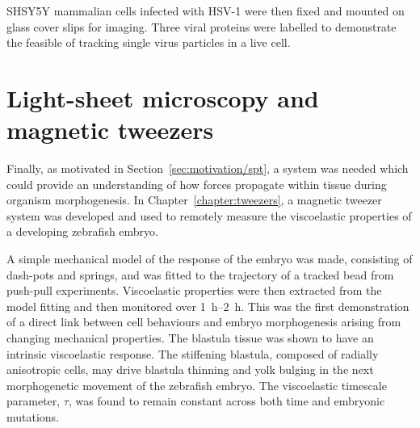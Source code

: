 SHSY5Y mammalian cells infected with \gls{HSV}-1 were then fixed and mounted on glass cover slips for imaging.
Three viral proteins were labelled to demonstrate the feasible of tracking single virus particles in a live cell.

\section{Light-sheet microscopy and magnetic tweezers} %

Finally, as motivated in Section~\ref{sec:motivation/spt}, a system was needed which could provide an understanding of how forces propagate within tissue during organism morphogenesis.
In Chapter~\ref{chapter:tweezers}, a magnetic tweezer system was developed and used to remotely measure the viscoelastic properties of a developing zebrafish embryo.

A simple mechanical model of the response of the embryo was made, consisting of dash-pots and springs, and was fitted to the trajectory of a tracked bead from push-pull experiments.
Viscoelastic properties were then extracted from the model fitting and then monitored over \SIrange{1}{2}{\hour}.
This was the first demonstration of a direct link between cell behaviours and embryo morphogenesis arising from changing mechanical properties.
The blastula tissue was shown to have an intrinsic viscoelastic response.
The stiffening blastula, composed of radially anisotropic cells, may drive blastula thinning and yolk bulging in the next morphogenetic movement of the zebrafish embryo.
The viscoelastic timescale parameter, \(\tau\), was found to remain constant across both time and embryonic mutations.

